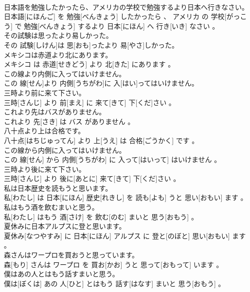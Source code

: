 \documentclass[8pt]{extreport}
\begin{document}
\begin{CJK}{UTF8}{min}
\\	日本語を勉強したかったら、アメリカの学校で勉強するより日本へ行きなさい。	
\\	日本語[にほんご] を 勉強[べんきょう] したかったら 、 アメリカ の 学校[がっこう] で 勉強[べんきょう] するより 日本[にほん] へ 行き[いき] なさい 。
\\	その試験は思ったより易しかった。	
\\	その 試験[しけん]は 思[おも]ったより 易[やさ]しかった。
\\	メキシコは赤道より北にあります。	
\\	メキシコ は 赤道[せきどう] より 北[きた] にあります 。
\\	この線より内側に入ってはいけません。	
\\	この 線[せん]より 内側[うちがわ]に 入[はい]ってはいけません。
\\	三時より前に来て下さい。	
\\	三時[さんじ] より 前[まえ] に 来て[きて] 下[くだ]さい 。
\\	これより先はバスがありません。	
\\	これより 先[さき] は バス がありません 。
\\	八十点より上は合格です。	
\\	八十点[はちじゅってん] より 上[うえ] は 合格[ごうかく] です 。
\\	この線から内側に入ってはいけません。	
\\	この 線[せん] から 内側[うちがわ] に 入って[はいって] はいけません 。
\\	三時より後に来て下さい。	
\\	三時[さんじ] より 後に[あとに] 来て[きて] 下[くだ]さい 。
\\	私は日本歴史を読もうと思います。	
\\	私[わたし] は 日本[にほん] 歴史[れきし] を 読も[よも] うと 思い[おもい] ます 。
\\	私はもう酒を飲むまいと思う。	
\\	私[わたし] はもう 酒[さけ] を 飲む[のむ] まいと 思う[おもう] 。
\\	夏休みに日本アルプスに登と思います。	
\\	夏休み[なつやすみ] に 日本[にほん] アルプス に 登と[のぼと] 思い[おもい] ます 。
\\	森さんはワープロを買おうと思っています。	
\\	森[もり] さんは ワープロ を 買お[かお] うと 思って[おもって] います 。
\\	僕はあの人とはもう話すまいと思う。	
\\	僕は[ぼくは] あの 人[ひと] とはもう 話す[はなす] まいと 思う[おもう] 。

\end{CJK}
\end{document}
